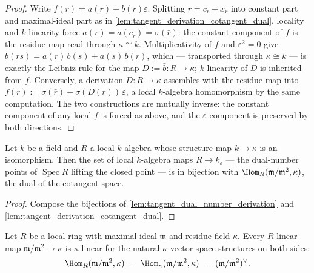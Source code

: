 \begin{proof}\leanok
  Write \(f(r) = a(r) + b(r)\varepsilon\). Splitting
  \(r = c_r + x_r\) into constant part and maximal-ideal part as in
  \cref{lem:tangent_derivation_cotangent_dual}, locality and
  \(k\)-linearity force \(a(r) = a(c_r) = \sigma(\bar r)\): the
  constant component of \(f\) is the residue map read through
  \(\kappa \cong k\). Multiplicativity of \(f\) and
  \(\varepsilon^2 = 0\) give
  \(b(rs) = a(r)\,b(s) + a(s)\,b(r)\), which — transported through
  \(\kappa \cong k\) — is exactly the Leibniz rule for the map
  \(D := \bar b : R \to \kappa\); \(k\)-linearity of \(D\) is
  inherited from \(f\). Conversely, a derivation
  \(D : R \to \kappa\) assembles with the residue map into
  \(f(r) := \sigma(\bar r) + \sigma(D(r))\,\varepsilon\), a local
  \(k\)-algebra homomorphism by the same computation. The two
  constructions are mutually inverse: the constant component of any
  local \(f\) is forced as above, and the \(\varepsilon\)-component
  is preserved by both directions.
\end{proof}

\begin{corollary}\leanok
  \label{cor:tangent_dual_number_cotangent_dual}
  Let \(k\) be a field and \(R\) a local \(k\)-algebra whose
  structure map \(k \to \kappa\) is an isomorphism. Then the set of
  local \(k\)-algebra maps \(R \to k_\varepsilon\) — the dual-number
  points of \(\operatorname{Spec} R\) lifting the closed point — is
  in bijection with
  \(\Hom_R(\mathfrak m/\mathfrak m^2, \kappa)\), the dual of the
  cotangent space.
\end{corollary}

\begin{proof}\leanok
  Compose the bijections of
  \cref{lem:tangent_dual_number_derivation} and
  \cref{lem:tangent_derivation_cotangent_dual}.
\end{proof}

\begin{lemma}\leanok
  \label{lem:tangent_cotangent_dual_kappa_linear}
  Let \(R\) be a local ring with maximal ideal \(\mathfrak m\) and
  residue field \(\kappa\). Every \(R\)-linear map
  \(\mathfrak m/\mathfrak m^2 \to \kappa\) is \(\kappa\)-linear for
  the natural \(\kappa\)-vector-space structures on both sides:
  \[
    \Hom_R(\mathfrak m/\mathfrak m^2, \kappa)
    \;=\;
    \Hom_\kappa(\mathfrak m/\mathfrak m^2, \kappa)
    \;=\; (\mathfrak m/\mathfrak m^2)^{\vee}.
  \]
\end{lemma}

